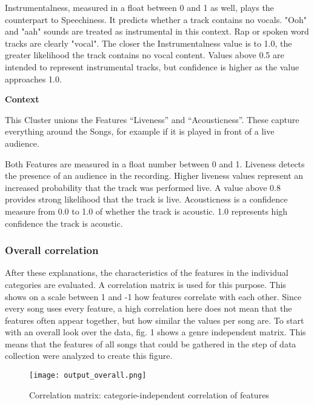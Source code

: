 Instrumentalness, measured in a float between 0 and 1 as well, plays the counterpart to Speechiness.
It predicts whether a track contains no vocals. 
"Ooh" and "aah" sounds are treated as instrumental in this context.
Rap or spoken word tracks are clearly "vocal". 
The closer the Instrumentalness value is to 1.0, the greater likelihood the track contains no vocal content. 
Values above 0.5 are intended to represent instrumental tracks,
but confidence is higher as the value approaches 1.0.

\textbf{Context}

This Cluster unions the Features “Liveness” and “Acousticness”.
These capture everything around the Songs, for example if it is played in front of a live audience.

Both Features are measured in a float number between 0 and 1.
Liveness detects the presence of an audience in the recording. 
Higher liveness values represent an increased probability that the track was performed live.
A value above 0.8 provides strong likelihood that the track is live. 
Acousticness is a confidence measure from 0.0 to 1.0 of whether the track is acoustic.
1.0 represents high confidence the track is acoustic. 

\subsubsection{Overall correlation}
After these explanations, the characteristics of the features in the individual categories are evaluated.
A correlation matrix is used for this purpose. This shows on a scale between 1 and -1 how
features correlate with each other. Since every song uses every feature,
a high correlation here does not mean that the features often appear together,
but how similar the values per song are. To start with an overall look over the data,
fig. 1  shows a genre independent matrix.
This means that the features of all songs that could be gathered in the step of data
collection were analyzed to create this figure. 

\begin{figure}[H]
    \centering
    \caption[]{Correlation matrix: categorie-independent correlation of features}
	\label{fig:du_cm_overall}
    \texttt{[image: output\_overall.png]}
\end{figure}

